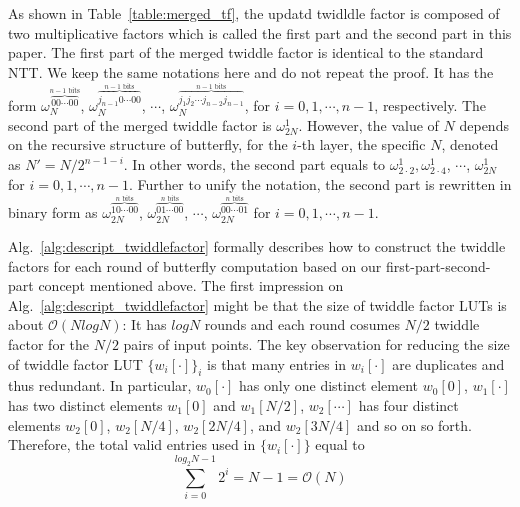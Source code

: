 \documentclass[submission]{iacrtrans}
\theoremstyle{plain}
\begin{document}
As shown in Table~\ref{table:merged_tf}, the updatd twidldle factor is composed of two multiplicative factors which is called the first part and the second part in this paper. The first part of the merged twiddle factor is identical to the standard NTT. We keep the same notations here and do not repeat the proof. It has the form $\omega_{N}^{\overbrace{00\cdots 00}^{n-1 \text{ bits}}}$, $\omega_{N}^{\overbrace{j_{n-1}0\cdots 00}^{n-1 \text{ bits}}}$, $\cdots$, $\omega_{N}^{\overbrace{j_1j_2\cdots j_{n-2}j_{n-1}}^{n-1 \text{ bits}}}$, for $i=0,1,\cdots,n-1$, respectively.
The second part of the merged twiddle factor is $\omega_{2N}^1$. However, the value of $N$ depends on the recursive structure of butterfly, for the $i$-th layer, the specific $N$, denoted as $N'=N/2^{n-1-i}$. In other words, the second part equals to $\omega_{2\cdot 2}^1, \omega_{2\cdot 4}^1$, $\cdots$, $\omega_{2N}^1$ for $i=0,1,\cdots,n-1$. Further to unify the notation, the second part is rewritten in binary form as $\omega_{2N}^{\overbrace{10\cdots 00}^{n\text{ bits}}}$, $\omega_{2N}^{\overbrace{01\cdots 00}^{n\text{ bits}}}$, $\cdots$, $\omega_{2N}^{\overbrace{00\cdots 01}^{n\text{ bits}}}$ for $i=0,1,\cdots,n-1$.

Alg.~\ref{alg:descript_twiddlefactor} formally describes how to construct the twiddle factors for each round of butterfly computation based on our first-part-second-part concept mentioned above.
The first impression on Alg.~\ref{alg:descript_twiddlefactor} might be that the size of twiddle factor LUTs is about $\mathcal{O}(NlogN)$: It has $logN$ rounds and each round cosumes $N/2$ twiddle factor for the $N/2$ pairs of input points.  The key observation for reducing the size of twiddle factor LUT $\{w_i[\cdot]\}_i$ is that many entries in $w_i[\cdot]$ are duplicates and thus redundant. In particular, $w_0[\cdot]$ has only one distinct element $w_0[0]$, $w_1[\cdot]$ has two distinct elements $w_1[0]$ and $w_1[N/2]$, $w_2[\cdots]$ has four distinct elements $w_2[0]$, $w_2[N/4]$, $w_2[2N/4]$, and $w_2[3N/4]$ and so on so forth. Therefore, the total valid entries used in $\{w_i[\cdot]\}$ equal to
\[
\sum_{i=0}^{log_2N-1} 2^i = N-1 = \mathcal{O}(N) 
\]
\end{document}
